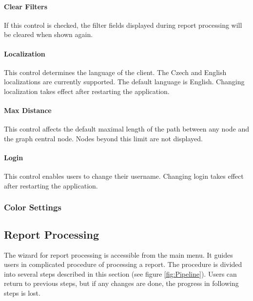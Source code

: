 \paragraph{Clear Filters} If this control is checked, the filter fields
displayed during report processing will be cleared when shown again.

\paragraph{Localization} This control determines the language of the \textan{}
client. The Czech and English localizations are currently supported. The
default language is English. Changing localization takes effect after
restarting the application.

\paragraph{Max Distance} This control affects the default maximal length of the
path between any node and the graph central node. Nodes beyond this limit are
not displayed.

\paragraph{Login} This control enables users to change their username. Changing
login takes effect after restarting the application.

\subsubsection{Color Settings}

\subsection{Report Processing}
\label{ssec:ProcessReport}

The wizard for report processing is accessible from the main menu. It guides
users in complicated procedure of processing a report. The procedure is divided
into several steps described in this section (see figure \ref{fig:Pipeline}).
Users can return to previous steps, but if any changes are done, the progress
in following steps is lost.

